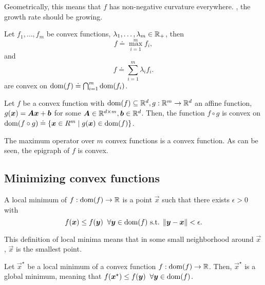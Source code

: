 Geometrically, this means that $f$ has non-negative curvature everywhere. \Ie, the growth rate
should be growing.

\begin{corollary}
    Let $f_1,\ldots,f_m$ be convex functions, $\lambda_1,\ldots,\lambda_m\in \mathbb{R}_+$, then \[
        f \doteq \max_{i=1}^m f_i,
    \]
    and \[
        f \doteq \sum_{i=1}^m \lambda_i f_i.
    \]
    are convex on $\mathrm{dom}(f) \doteq \bigcap_{i=1}^m \mathrm{dom}(f_i)$.

    Let $f$ be a convex function with $\mathrm{dom}(f) \subseteq \mathbb{R}^d, g: \mathbb{R}^m \to \mathbb{R}^d$ an affine function,
    \ie $g(\bm{x}) = \bm{A}\bm{x} + \bm{b}$ for some $\bm{A}\in \mathbb{R}^{d\times m},\bm{b}\in \mathbb{R}^d$.
    Then, the function $f \circ g$ is convex on $\mathrm{dom}(f \circ g) \doteq \{ \bm{x}\in R^m \mid
        g(\bm{x}) \in \mathrm{dom}(f) \}$.
\end{corollary}

\begin{marginfigure}
    \centering
    \caption{The maximum operator over $m$ convex functions is a convex function. As can be seen, the epigraph of $f$ is convex.}
    \label{fig:max-convexity}
\end{marginfigure}

\subsection{Minimizing convex functions}

\begin{definition}
    A local minimum of $f: \mathrm{dom}(f) \to \mathbb{R}$ is a point $\vec{x}$ such that there exists $\epsilon > 0$ with \[
        f(\bm{x}) \leq f(\bm{y}) \;\; \forall \bm{y} \in \mathrm{dom}(f) \text{ s.t. } \| \bm{y}-\bm{x} \| < \epsilon.
    \]
\end{definition}

\begin{remark}
    This definition of local minima means that in some small neighborhood around $\vec{x}$, $\vec{x}$ is the smallest point.
\end{remark}

\begin{lemma}
    Let $\vec{x}^\star$ be a local minimum of a convex function $f: \mathrm{dom}(f) \to \mathbb{R}$. Then,
    $\vec{x}^\star$ is a global minimum, meaning that
    $f(\bm{x}^\star) \leq f(\bm{y}) \;\; \forall \bm{y} \in \mathrm{dom}(f)$.
\end{lemma}

